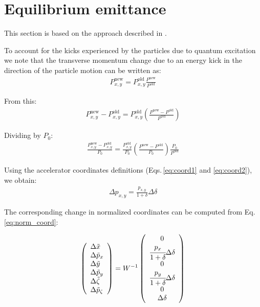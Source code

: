 \section{Equilibrium emittance}

This section is based on the approach described in \cite{chao_eq_emit}.

To account for the kicks experienced by the particles due to quantum excitation we note that the transverse momentum change due to an energy kick in the direction of the particle motion can be written as:
\begin{align}
P_{x,y}^\text{new} = P_{x,y}^\text{old}  \frac{P^\text{new}}{P^\text{old}}
\end{align}

From this:
\begin{align}
P_{x,y}^\text{new} - P_{x,y}^\text{old} = P_{x,y}^\text{old}  \left(\frac{P^\text{new} - P^\text{old}}{P^\text{old}} \right) 
\end{align}

Dividing by $P_0$:
\begin{align}
\frac{P_{x,y}^\text{new} - P_{x,y}^\text{old}}{P_0} = 
\frac{P_{x,y}^\text{old}}{P_0}
\left(\frac{P^\text{new} - P^\text{old}}{P_0} \right) 
\frac{P_0}{P^\text{old}}
\end{align}

Using the accelerator coordinates definitions (Eqs.\,\ref{eq:coord1} and \ref{eq:coord2}), we obtain:
\begin{align}
\Delta p_{x,y} = \frac{p_{x,y}}{1 + \delta} \Delta \delta
\end{align}

The corresponding change in normalized coordinates can be computed from Eq.\,\ref{eq:norm_coord}:

\begin{equation}
\left(\begin{array}{l}
\Delta \tilde{x} \\
\Delta \tilde{p}_x\\
\Delta \tilde{y} \\
\Delta \tilde{p}_y \\
\Delta \tilde{\zeta} \\
\Delta \tilde{p}_\zeta
\end{array}\right)
=
W^{-1}
\left(\begin{array}{c}
0 \\
\cfrac{p_{x}}{1 + \delta} \Delta \delta \\
0 \\
\cfrac{p_{y}}{1 + \delta} \Delta \delta \\
0 \\
\Delta \delta
\end{array}\right)
\label{eq:norm_coord}
\end{equation}

